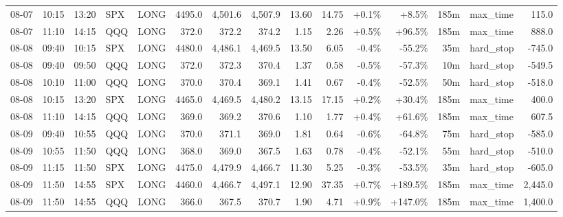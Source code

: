 \documentclass[11pt,a4paper,twoside]{article}
\begin{document}
\begin{landscape}
\begin{center}
\begin{longtable}{>{\color{txtmain}}l l l l l r r r r r r r r >{\color{txtmain}}l r}
08-07 & 10:15 & 13:20 & SPX & LONG & 4495.0 & 4,501.6 & 4,507.9 & 13.60 & 14.75 & \textcolor{wingreen}{+0.1\%} & \textcolor{wingreen}{+8.5\%} & 185m & max\_time & \textcolor{wingreen}{115.0} \\
08-07 & 11:10 & 14:15 & QQQ & LONG & 372.0 & 372.2 & 374.2 & 1.15 & 2.26 & \textcolor{wingreen}{+0.5\%} & \textcolor{wingreen}{+96.5\%} & 185m & max\_time & \textcolor{wingreen}{888.0} \\
08-08 & 09:40 & 10:15 & SPX & LONG & 4480.0 & 4,486.1 & 4,469.5 & 13.50 & 6.05 & \textcolor{lossred}{-0.4\%} & \textcolor{lossred}{-55.2\%} & 35m & hard\_stop & \textcolor{lossred}{-745.0} \\
08-08 & 09:40 & 09:50 & QQQ & LONG & 372.0 & 372.3 & 370.4 & 1.37 & 0.58 & \textcolor{lossred}{-0.5\%} & \textcolor{lossred}{-57.3\%} & 10m & hard\_stop & \textcolor{lossred}{-549.5} \\
08-08 & 10:10 & 11:00 & QQQ & LONG & 370.0 & 370.4 & 369.1 & 1.41 & 0.67 & \textcolor{lossred}{-0.4\%} & \textcolor{lossred}{-52.5\%} & 50m & hard\_stop & \textcolor{lossred}{-518.0} \\
08-08 & 10:15 & 13:20 & SPX & LONG & 4465.0 & 4,469.5 & 4,480.2 & 13.15 & 17.15 & \textcolor{wingreen}{+0.2\%} & \textcolor{wingreen}{+30.4\%} & 185m & max\_time & \textcolor{wingreen}{400.0} \\
08-08 & 11:10 & 14:15 & QQQ & LONG & 369.0 & 369.2 & 370.6 & 1.10 & 1.77 & \textcolor{wingreen}{+0.4\%} & \textcolor{wingreen}{+61.6\%} & 185m & max\_time & \textcolor{wingreen}{607.5} \\
08-09 & 09:40 & 10:55 & QQQ & LONG & 370.0 & 371.1 & 369.0 & 1.81 & 0.64 & \textcolor{lossred}{-0.6\%} & \textcolor{lossred}{-64.8\%} & 75m & hard\_stop & \textcolor{lossred}{-585.0} \\
08-09 & 10:55 & 11:50 & QQQ & LONG & 368.0 & 369.0 & 367.5 & 1.63 & 0.78 & \textcolor{lossred}{-0.4\%} & \textcolor{lossred}{-52.1\%} & 55m & hard\_stop & \textcolor{lossred}{-510.0} \\
08-09 & 11:15 & 11:50 & SPX & LONG & 4475.0 & 4,479.9 & 4,466.7 & 11.30 & 5.25 & \textcolor{lossred}{-0.3\%} & \textcolor{lossred}{-53.5\%} & 35m & hard\_stop & \textcolor{lossred}{-605.0} \\
08-09 & 11:50 & 14:55 & SPX & LONG & 4460.0 & 4,466.7 & 4,497.1 & 12.90 & 37.35 & \textcolor{wingreen}{+0.7\%} & \textcolor{wingreen}{+189.5\%} & 185m & max\_time & \textcolor{wingreen}{2,445.0} \\
08-09 & 11:50 & 14:55 & QQQ & LONG & 366.0 & 367.5 & 370.7 & 1.90 & 4.71 & \textcolor{wingreen}{+0.9\%} & \textcolor{wingreen}{+147.0\%} & 185m & max\_time & \textcolor{wingreen}{1,400.0} \\

\end{longtable}
\end{center}
\end{landscape}
\end{document}
